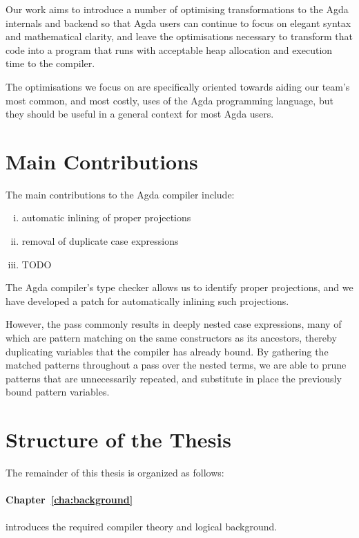 Our work aims to introduce a number of optimising transformations to the Agda internals and backend so that Agda users can continue to focus on elegant syntax and mathematical clarity, and leave the optimisations necessary to transform that code into a program that runs with acceptable heap allocation and execution time to the compiler.

The optimisations we focus on are specifically oriented towards aiding our team's most common, and most costly, uses of the Agda programming language, but they should be useful in a general context for most Agda users.

\section{Main Contributions}
\label{sec:main_contributions}

The main contributions to the Agda compiler include:
\begin{enumerate}[(i)]
	\item automatic inlining of proper projections
	\item removal of duplicate case expressions
	\item TODO
\end{enumerate}

The Agda compiler's type checker allows us to identify proper projections, and we have developed a patch for automatically inlining such projections.

However, the pass commonly results in deeply nested case expressions, many of which are pattern matching on the same constructors as its ancestors, thereby duplicating variables that the compiler has already bound. By gathering the matched patterns throughout a pass over the nested terms, we are able to prune patterns that are unnecessarily repeated, and substitute in place the previously bound pattern variables.

\section{Structure of the Thesis}
\label{sec:structure_of_the_thesis}

The remainder of this thesis is organized as follows:

\paragraph{Chapter~\ref{cha:background}} introduces the required compiler theory and logical background.

